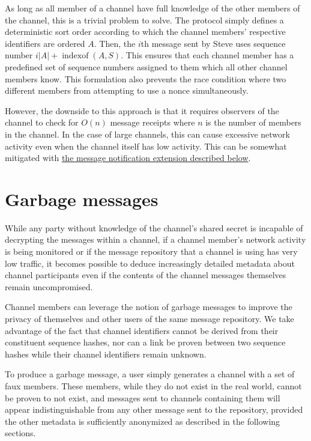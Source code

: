 As long as all member of a channel have full knowledge of the other members of the channel, this is a trivial problem to solve. The protocol simply defines a deterministic sort order according to which the channel members' respective identifiers are ordered $A$. Then, the $i$th message sent by Steve uses sequence number $i \lvert A \rvert + \operatorname{indexof}(A, S)$. This ensures that each channel member has a predefined set of sequence numbers assigned to them which all other channel members know. This formulation also prevents the race condition where two different members from attempting to use a nonce simultaneously.

However, the downside to this approach is that it requires observers of the channel to check for $O(n)$ message receipts where $n$ is the number of members in the channel. In the case of large channels, this can cause excessive network activity even when the channel itself has low activity. This can be somewhat mitigated with \hyperref[message-notifications]{the message notification extension described below}.

\section{Garbage messages}\label{garbage-messages}

While any party without knowledge of the channel's shared secret is incapable of decrypting the messages within a channel, if a channel member's network activity is being monitored or if the message repository that a channel is using has very low traffic, it becomes possible to deduce increasingly detailed metadata about channel participants even if the contents of the channel messages themselves remain uncompromised.

Channel members can leverage the notion of garbage messages to improve the privacy of themselves and other users of the same message repository. We take advantage of the fact that channel identifiers cannot be derived from their constituent sequence hashes, nor can a link be proven between two sequence hashes while their channel identifiers remain unknown.

To produce a garbage message, a user simply generates a channel with a set of faux members. These members, while they do not exist in the real world, cannot be proven to not exist, and messages sent to channels containing them will appear indistinguishable from any other message sent to the repository, provided the other metadata is sufficiently anonymized as described in the following sections.


